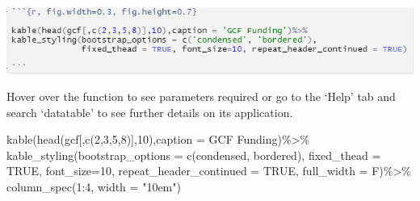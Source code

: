 \documentclass[
]{book}
\newenvironment{Shaded}{\begin{snugshade}}{\end{snugshade}}
\newcommand{\AttributeTok}[1]{\textcolor[rgb]{0.77,0.63,0.00}{#1}}
\newcommand{\ConstantTok}[1]{\textcolor[rgb]{0.00,0.00,0.00}{#1}}
\newcommand{\DecValTok}[1]{\textcolor[rgb]{0.00,0.00,0.81}{#1}}
\newcommand{\FunctionTok}[1]{\textcolor[rgb]{0.00,0.00,0.00}{#1}}
\newcommand{\NormalTok}[1]{#1}
\newcommand{\SpecialCharTok}[1]{\textcolor[rgb]{0.00,0.00,0.00}{#1}}
\newcommand{\StringTok}[1]{\textcolor[rgb]{0.31,0.60,0.02}{#1}}
\let\origfigure\figure
\let\endorigfigure\endfigure
\renewenvironment{figure}[1][2] {
    \expandafter\origfigure\expandafter[H]
} {
    \endorigfigure
}
\begin{document}
\begin{figure}
\centering
\includegraphics{tutorial_screenshots/kable_table1.png}
\caption{kable table}
\end{figure}

Hover over the function to see parameters required or go to the `Help' tab and search `datatable' to see further details on its application.

\begin{Shaded}
\begin{Highlighting}[]
\FunctionTok{kable}\NormalTok{(}\FunctionTok{head}\NormalTok{(gcf[,}\FunctionTok{c}\NormalTok{(}\DecValTok{2}\NormalTok{,}\DecValTok{3}\NormalTok{,}\DecValTok{5}\NormalTok{,}\DecValTok{8}\NormalTok{)],}\DecValTok{10}\NormalTok{),}\AttributeTok{caption =} \StringTok{\textquotesingle{}GCF Funding\textquotesingle{}}\NormalTok{)}\SpecialCharTok{\%\textgreater{}\%}
\FunctionTok{kable\_styling}\NormalTok{(}\AttributeTok{bootstrap\_options =} \FunctionTok{c}\NormalTok{(}\StringTok{\textquotesingle{}condensed\textquotesingle{}}\NormalTok{, }\StringTok{\textquotesingle{}bordered\textquotesingle{}}\NormalTok{),}
              \AttributeTok{fixed\_thead =} \ConstantTok{TRUE}\NormalTok{, }\AttributeTok{font\_size=}\DecValTok{10}\NormalTok{, }\AttributeTok{repeat\_header\_continued =} \ConstantTok{TRUE}\NormalTok{, }\AttributeTok{full\_width =}\NormalTok{ F)}\SpecialCharTok{\%\textgreater{}\%}
  \FunctionTok{column\_spec}\NormalTok{(}\DecValTok{1}\SpecialCharTok{:}\DecValTok{4}\NormalTok{, }\AttributeTok{width =} \StringTok{"10em"}\NormalTok{)}
\end{Highlighting}
\end{Shaded}
\end{document}
